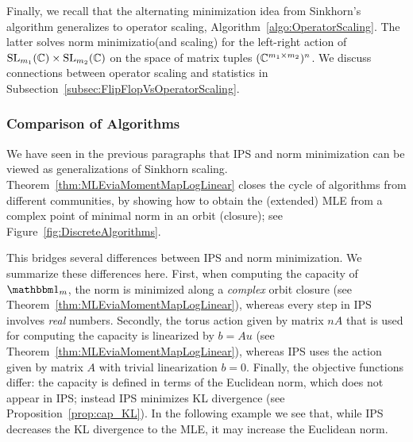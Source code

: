 Finally, we recall that the alternating minimization idea from Sinkhorn's algorithm generalizes to operator scaling, Algorithm~\ref{algo:OperatorScaling}. The latter solves norm minimizatio(and scaling) for the left-right action of $\operatorname{SL}_{m_1}(\mathbb C) \times \operatorname{SL}_{m_2}(\mathbb C)$ on the space of matrix tuples $(\mathbb C^{m_1 \times m_2})^n$.
We discuss connections between operator scaling and statistics in Subsection~\ref{subsec:FlipFlopVsOperatorScaling}.


\subsubsection*{Comparison of Algorithms}

We have seen in the previous paragraphs that IPS and norm minimization can be viewed as generalizations of Sinkhorn scaling.
Theorem~\ref{thm:MLEviaMomentMapLogLinear} closes the cycle of algorithms from different communities, by showing how to obtain the (extended) MLE from a complex point of minimal norm in an orbit (closure); see Figure~\ref{fig:DiscreteAlgorithms}.

This bridges several differences between IPS and norm minimization.
We summarize these differences here.
First, when computing the capacity of $\ones_m$, the norm is minimized along a \emph{complex} orbit closure (see Theorem~\ref{thm:MLEviaMomentMapLogLinear}), whereas every step in IPS involves \emph{real} numbers.
Secondly, the torus action given by  matrix $n A$ that is used for computing the capacity is linearized by  $b = Au$ (see Theorem~\ref{thm:MLEviaMomentMapLogLinear}), whereas IPS uses the action given by matrix $A$ with trivial linearization $b=0$.
Finally,
the objective functions differ: the capacity is defined in terms of the Euclidean norm, which does not appear in IPS; instead 
IPS minimizes KL divergence (see Proposition~\ref{prop:cap_KL}). In the following example we see that, while IPS decreases the KL divergence to the MLE, it may increase the Euclidean norm.

